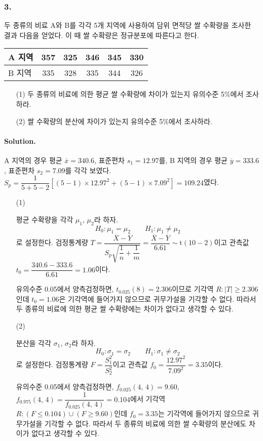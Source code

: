 \subsubsection{3.} 두 종류의 비료 A와 B를 각각 5개 지역에 사용하여 담위 면적당 쌀 수확량을 조사한 결과 다음을 얻었다.
이 때 쌀 수확량은 정규분포에 따른다고 한다.

\begin{center}
    \begin{tabular}{l|ccccc}
        \hline
        A 지역 & 357 & 325 & 346 & 345 & 330 \\
        \hline
        B 지역 & 335 & 328 & 335 & 344 & 326 \\
        \hline
    \end{tabular}
\end{center}

\begin{itemize}
    \item[(1)] 두 종류의 비료에 의한 평균 쌀 수확량에 차이가 있는지 유의수준 5\%에서 조사하라.
    \item[(2)] 쌀 수확량의 분산에 차이가 있는지 유의수준 5\%에서 조사하라. 
\end{itemize}

\paragraph{Solution.} A 지역의 경우 평균 $\overline{x}=340.6$, 표준편차 $s_1=12.97$를,
B 지역의 경우 평균 $\overline{y}=333.6$, 표준편차 $s_2=7.09$를 각각 보였다.
$S_p=\dfrac{1}{5+5-2}\left[\left(5-1\right)\times12.97^2+\left(5-1\right)\times7.09^2\right]=109.24$였다.

\begin{itemize}
    \item[(1)] {
        평균 수확량을 각각 $\mu_1$, $\mu_2$라 하자.
        \[H_0:\mu_1=\mu_2 \qquad H_1:\mu_1\neq\mu_2\]
        로 설정한다. 검정통계량 $T=\dfrac{\overline{X}-\overline{Y}}{S_p\sqrt{\dfrac{1}{n}+\dfrac{1}{m}}}
        =\dfrac{\overline{X}-\overline{Y}}{6.61}\sim \mathrm{t}\left(10-2\right)$이고 관측값
        $t_0=\dfrac{340.6-333.6}{6.61}=1.06$이다.

        유의수준 0.05에서 양측검정하면, $t_{0.025}\left(8\right)=2.306$이므로 기각역 $R:\left|T\right|\geq 2.306$인데
        $t_0=1.06$은 기각역에 들어가지 않으므로 귀무가설을 기각할 수 없다. 따라서 두 종류의 비료에 의한 평균 쌀 수확량에는
        차이가 없다고 생각할 수 있다.
    }
    \item[(2)] {
        분산을 각각 $\sigma_1$, $\sigma_2$라 하자.
        \[H_0:\sigma_1=\sigma_2 \qquad H_1:\sigma_1\neq\sigma_2\]
        로 설정한다. 검정통계량 $F=\dfrac{S_1^2}{S_2^2}$이고 관측값 $f_0=\dfrac{12.97^2}{7.09^2}=3.35$이다.

        유의수준 0.05에서 양측검정하면, $f_{0.025}\left(4,\,4\right)=9.60$, $f_{0.975}\left(4,\,4\right)
        =\dfrac{1}{f_{0.025}\left(4,\,4\right)}=0.104$에서
        기각역 $R:\left(F\leq 0.104\right) \cup \left(F\geq 9.60\right)$인데
        $f_0=3.35$는 기각역에 들어가지 않으므로 귀무가설을 기각할 수 없다. 따라서 두 종류의 비료에 의한 쌀 수확량의 분산에도
        차이가 없다고 생각할 수 있다.
    }
\end{itemize}

